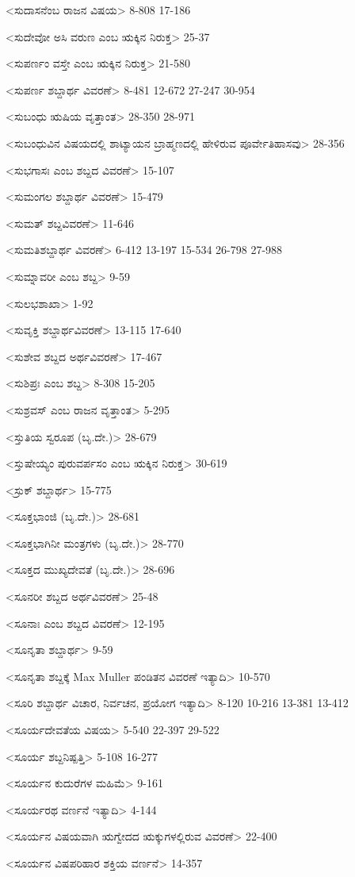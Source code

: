 <ಸುದಾಸನೆಂಬ ರಾಜನ ವಿಷಯ>
8-808
17-186

<ಸುದೇವೋ ಅಸಿ ವರುಣ ಎಂಬ ಋಕ್ಕಿನ ನಿರುಕ್ತ>
25-37

<ಸುಪರ್ಣಂ ವಸ್ತೇ ಎಂಬ ಋಕ್ಕಿನ ನಿರುಕ್ತ>
21-580

<ಸುಪರ್ಣ ಶಬ್ದಾರ್ಥ ವಿವರಣೆ>
8-481
12-672
27-247
30-954

<ಸುಬಂಧು ಋಷಿಯ ವೃತ್ತಾಂತ>
28-350
28-971

<ಸುಬಂಧುವಿನ ವಿಷಯದಲ್ಲಿ ಶಾಟ್ಯಾಯನ ಬ್ರಾಹ್ಮಣದಲ್ಲಿ ಹೇಳಿರುವ ಪೂರ್ವೇತಿಹಾಸವು>
28-356

<ಸುಭಗಾಸಃ ಎಂಬ ಶಬ್ದದ ವಿವರಣೆ>
15-107

<ಸುಮಂಗಲ ಶಬ್ದಾರ್ಥ ವಿವರಣೆ>
15-479

<ಸುಮತ್‍ ಶಬ್ದವಿವರಣೆ>
11-646

<ಸುಮತಿಶಬ್ದಾರ್ಥ ವಿವರಣೆ>
6-412 
13-197
15-534 
26-798
27-988

<ಸುಮ್ನಾವರೀ ಎಂಬ ಶಬ್ದ>
9-59

<ಸುಲಭಶಾಖಾ>
1-92

<ಸುವೃಕ್ತಿ ಶಬ್ದಾರ್ಥವಿವರಣೆ>
13-115
17-640

<ಸುಶೇವ ಶಬ್ದದ ಅರ್ಥವಿವರಣೆ>
17-467


<ಸುಶಿಪ್ರಃ ಎಂಬ ಶಬ್ದ>
8-308
15-205

<ಸುಶ್ರವಸ್‍ ಎಂಬ ರಾಜನ ವೃತ್ತಾಂತ>
5-295

<ಸ್ತುತಿಯ ಸ್ವರೂಪ (ಬೃ.ದೇ.)>
28-679

<ಸ್ತುಷೇಯ್ಯಂ ಪುರುವರ್ಪಸಂ ಎಂಬ ಋಕ್ಕಿನ ನಿರುಕ್ತ>
30-619

<ಸ್ರುಕ್‍ ಶಬ್ದಾರ್ಥ>
15-775

<ಸೂಕ್ತಭಾಂಜಿ (ಬೃ.ದೇ.)>
28-681

<ಸೂಕ್ತಭಾಗಿನೀ ಮಂತ್ರಗಳು (ಬೃ.ದೇ.)>
28-770

<ಸೂಕ್ತದ ಮುಖ್ಯದೇವತೆ (ಬೃ.ದೇ.)>
28-696

<ಸೂನರೀ ಶಬ್ದದ ಅರ್ಥವಿವರಣೆ>
25-48

<ಸೂನಾಃ ಎಂಬ ಶಬ್ದದ ವಿವರಣೆ>
12-195

<ಸೂನೃತಾ ಶಬ್ದಾರ್ಥ>
9-59

<ಸೂನೃತಾ ಶಬ್ದಕ್ಕೆ Max Muller ಪಂಡಿತನ ವಿವರಣೆ ಇತ್ಯಾದಿ>
10-570

<ಸೂರಿ ಶಬ್ದಾರ್ಥ ವಿಚಾರ, ನಿರ್ವಚನ, ಪ್ರಯೋಗ ಇತ್ಯಾದಿ>
8-120
10-216
13-381
13-412

<ಸೂರ್ಯದೇವತೆಯ ವಿಷಯ>
5-540
22-397
29-522

<ಸೂರ್ಯ ಶಬ್ದನಿಷ್ಪತ್ತಿ>
5-108
16-277

<ಸೂರ್ಯನ ಕುದುರೆಗಳ ಮಹಿಮೆ>
9-161

<ಸೂರ್ಯರಥ ವರ್ಣನೆ ಇತ್ಯಾದಿ>
4-144

<ಸೂರ್ಯನ ವಿಷಯವಾಗಿ ಋಗ್ವೇದದ ಋಕ್ಕುಗಳಲ್ಲಿರುವ ವಿವರಣೆ>
22-400

<ಸೂರ್ಯನ ವಿಷಪರಿಹಾರ ಶಕ್ತಿಯ ವರ್ಣನೆ>
14-357

